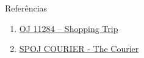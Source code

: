 \begin{frame}[fragile]{Referências}

    \begin{enumerate}
        \item \href{https://onlinejudge.org/index.php?option=com_onlinejudge&Itemid=8&category=24&page=show_problem&problem=2259}{OJ 11284 -- Shopping Trip}
 
        \item \href{https://www.spoj.com/problems/COURIER/}{SPOJ COURIER - The Courier}

    \end{enumerate}

\end{frame}
